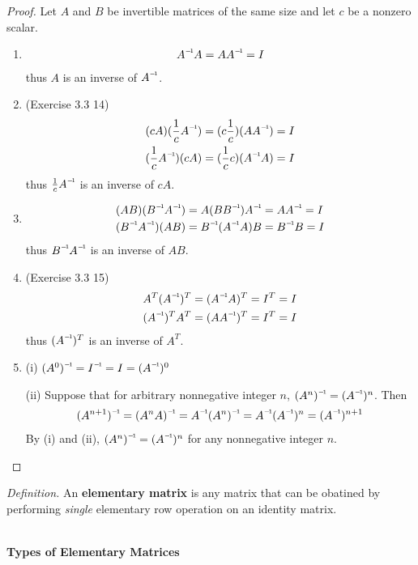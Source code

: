 \begin{proof}
	Let $A$ and $B$ be invertible matrices of the same size and let $c$ be a nonzero scalar.
	\begin{enumerate}
		\item
		\begin{align*}
		\inv{A}A = A\inv{A} = I
		\end{align*} thus $A$ is an inverse of $\inv{A}$.
		\item (Exercise 3.3 14)
		\begin{align*}
		(cA)(\frac{1}{c}\inv{A}) &= (c\frac{1}{c})(A\inv{A}) = I \\
		(\frac{1}{c}\inv{A})(cA) &= (\frac{1}{c}c)(\inv{A}A) = I
		\end{align*} thus $\frac{1}{c}\inv{A}$ is an inverse of $cA$.
		\item
		\begin{align*}
		(AB)(\inv{B}\inv{A}) &= A(B\inv{B})\inv{A} = A\inv{A} = I \\
		(\inv{B}\inv{A})(AB) &= \inv{B}(\inv{A}A)B = \inv{B}B = I
		\end{align*} thus $\inv{B}\inv{A}$ is an inverse of $AB$.
		\item (Exercise 3.3 15)
		\begin{align*}
		A^T(\inv{A})^T &= (\inv{A}A)^T = I^T = I \\
		(\inv{A})^TA^T &= (A\inv{A})^T = I^T = I
		\end{align*} thus $(\inv{A})^T$ is an inverse of $A^T$.
		\item (i) $\inv{(A^0)} = \inv{I} = I = (\inv{A})^0$
		
		\noindent (ii) Suppose that for arbitrary nonnegative integer $n$, $\inv{(A^n)} = (\inv{A})^n$. Then \begin{align*}
		\inv{(A^{n+1})} = \inv{(A^nA)} = \inv{A}\inv{(A^n)} = \inv{A}(\inv{A})^n = (\inv{A})^{n+1}
		\end{align*}
		By (i) and (ii), $\inv{(A^n)} = (\inv{A})^n$ for any nonnegative integer $n$.
	\end{enumerate}
\end{proof}

\noindent \textit{Definition.} An \textbf{elementary matrix} is any matrix that can be obatined by performing \textit{single} elementary row operation on an identity matrix.

\noindent \\ \textbf{Types of Elementary Matrices}

